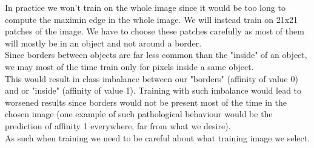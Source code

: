 In practice we won't train on the whole image since it would be too long to
compute the maximin edge in the whole image. We will instead train on 21x21
patches of the image. We have to choose these patches carefully as most of them
will mostly be in an object and not around a border.\\
Since borders between objects are far less common than the "inside" of an
object, we may most of the time train only for pixels inside a same object.\\
This would result in class imbalance between our "borders" (affinity of value
0) and or "inside" (affinity of value 1). Training with such imbalance would
lead to worsened results since borders would not be present most of the time in
the chosen image (one example of such pathological behaviour would be the
prediction of affinity 1 everywhere, far from what we desire).\\

As such when training we need to be careful about what training image we
select.



